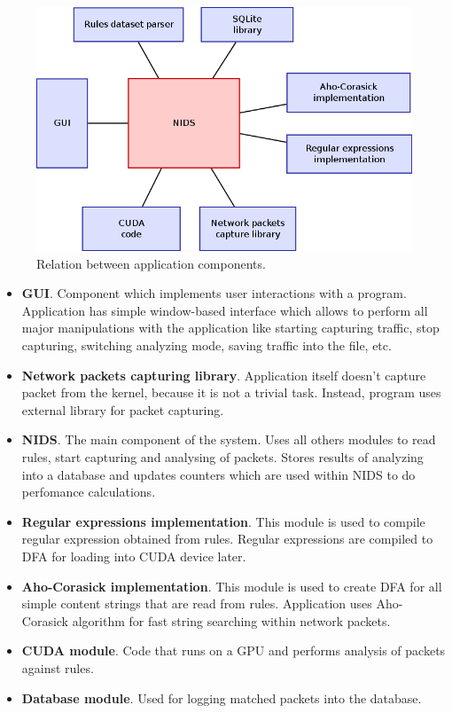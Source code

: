 \documentclass[thesis=M,english]{FITthesis}[2011/07/15]
\begin{document}
\begin{figure}
\centering
\includegraphics[scale=0.5]{images/app_architecture.png}
\caption{Relation between application components.}
\label{fig:app_architecture}
\end{figure}

\begin{itemize}
\item \textbf{GUI}. Component which implements user interactions with a program. Application has simple window-based interface which allows to perform all major manipulations with the application like starting capturing traffic, stop capturing, switching analyzing mode, saving traffic into the file, etc.
\item \textbf{Network packets capturing library}. Application itself doesn't capture packet from the kernel, because it is not a trivial task. Instead, program uses external library for packet capturing.
\item \textbf{NIDS}. The main component of the system. Uses all others modules to read rules, start capturing and analysing of packets. Stores results of analyzing into a database and updates counters which are used within NIDS to do perfomance calculations.
\item \textbf{Regular expressions implementation}. This module is used to compile regular expression obtained from rules. Regular expressions are compiled to DFA for loading into CUDA device later.
\item \textbf{Aho-Corasick implementation}. This module is used to create DFA for all simple content strings that are read from rules. Application uses Aho-Corasick algorithm for fast string searching within network packets.
\item \textbf{CUDA module}. Code that runs on a GPU and performs analysis of packets against rules.
\item \textbf{Database module}. Used for logging matched packets into the database.
\end{itemize}
\end{document}
